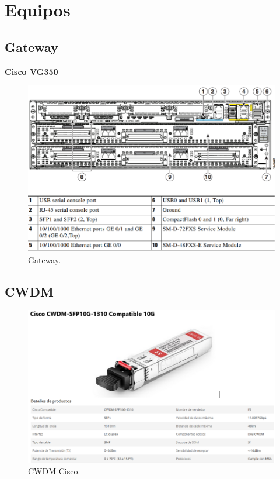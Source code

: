 \documentclass[12pt,letterpaper]{article}
\begin{document}
\newpage
\section{Equipos}
\subsection{Gateway}
\textbf{Cisco VG350}
\begin{figure}[ht]
    \centering
    \includegraphics[width=1\textwidth]{f35.png}
    \caption{Gateway.}
\end{figure}
\newpage
\subsection{CWDM}
\begin{figure}[ht]
    \centering
    \includegraphics[width=1\textwidth]{f36.png}
    \caption{CWDM Cisco.}
\end{figure}
\end{document}
